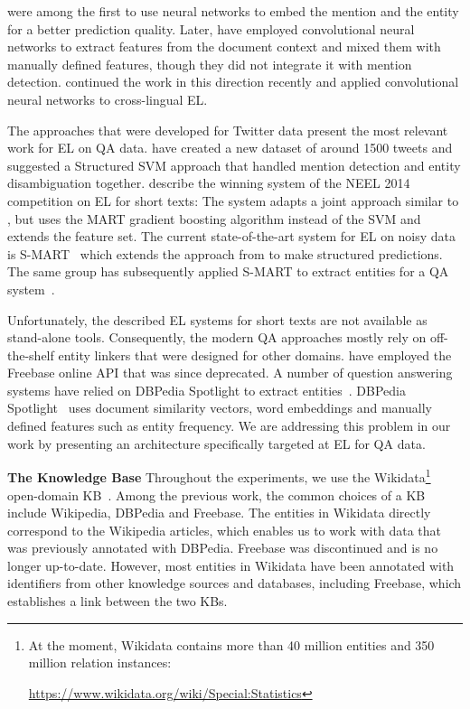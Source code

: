 \documentclass[11pt,a4paper]{article}
\begin{document}
\citet{Sun2015a} were among the first to use neural networks to embed the mention and the entity for a better prediction quality. Later,  \citet{Francis-Landau2016} have employed convolutional neural networks to extract features from the document context and mixed them with manually defined features, though they did not integrate it with mention detection.
\citet{Sil2017} continued the work in this direction recently and applied convolutional neural networks to cross-lingual EL.

The approaches that were developed for Twitter data present the most relevant work for EL on QA data. \citet{Guo2013a} have created a new dataset of around 1500 tweets and suggested a Structured SVM approach that handled mention detection and entity disambiguation together. \citet{Chang2014} describe the winning system of the NEEL 2014 competition on EL for short texts: The system adapts a joint approach similar to \citet{Guo2013a}, but uses the MART gradient boosting algorithm instead of the SVM and extends the feature set.
The current state-of-the-art system for EL on noisy data is S-MART~\citep{Yang2015a} which extends the approach from \citet{Chang2014} to make structured predictions. The same group has subsequently applied S-MART to extract entities for a QA system~\citep{Yih2015}.

Unfortunately, the described EL systems for short texts are not available as stand-alone tools. Consequently, the modern QA approaches mostly rely on off-the-shelf entity linkers that were designed for other domains.
\citet{Reddy2016} have employed the Freebase online API that was since deprecated. 
A number of question answering systems have relied on DBPedia Spotlight to extract entities~\cite{Lopez2016,Chen2016}. DBPedia Spotlight~\cite{Mendes2011} uses document similarity vectors, word embeddings and manually defined features such as entity frequency.
We are addressing this problem in our work by presenting an architecture specifically targeted at EL for QA data.

\textbf{The Knowledge Base} 
Throughout the experiments, we use the Wikidata\footnote{ At the moment, Wikidata contains more than 40 million entities and 350 million relation instances: \\ \raggedright \url{https://www.wikidata.org/wiki/Special:Statistics}} open-domain KB~\cite{Vrandecic2014}. 
Among the previous work, the common choices of a KB include Wikipedia, DBPedia and Freebase. The entities in Wikidata directly correspond to the Wikipedia articles, which enables us to work with data that was previously annotated with  DBPedia.
Freebase was discontinued and is no longer up-to-date. However, most entities in Wikidata have been annotated with identifiers from other knowledge sources and databases, including Freebase, which establishes a link between the two KBs.
\end{document}

